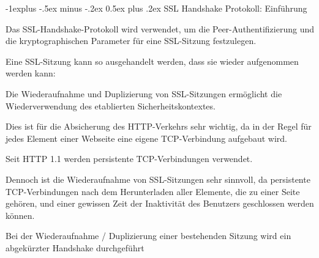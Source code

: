 \documentclass[a4paper]{article}
\makeatletter
\renewcommand{\subsection}{\@startsection{subsection}{2}{0mm}%
 {-1explus -.5ex minus -.2ex}%
 {0.5ex plus .2ex}%
 {\normalfont\normalsize\bfseries}}
\makeatother
\begin{document}
\begin{multicols}{3}
\begin{itemize*}
            \subsection{SSL Handshake Protokoll:
                  Einführung}
            \begin{itemize*}
                  \item       Das SSL-Handshake-Protokoll wird verwendet, um die
                  Peer-Authentifizierung und die kryptographischen Parameter für eine
                  SSL-Sitzung festzulegen.
                  \item       Eine SSL-Sitzung kann so ausgehandelt werden, dass sie wieder
                  aufgenommen werden kann:
                  \begin{itemize*}
                        \item Die Wiederaufnahme und Duplizierung von SSL-Sitzungen ermöglicht die Wiederverwendung des etablierten Sicherheitskontextes.
                        \item Dies ist für die Absicherung des HTTP-Verkehrs sehr wichtig, da in der Regel für jedes Element einer Webseite eine eigene TCP-Verbindung aufgebaut wird.
                        \begin{itemize*} \item Seit HTTP 1.1 werden persistente TCP-Verbindungen verwendet. \item Dennoch ist die Wiederaufnahme von SSL-Sitzungen sehr sinnvoll, da persistente TCP-Verbindungen nach dem Herunterladen aller Elemente, die zu einer Seite gehören, und einer gewissen Zeit der Inaktivität des Benutzers geschlossen werden können. \end{itemize*}
                        \item Bei der Wiederaufnahme / Duplizierung einer bestehenden Sitzung wird ein abgekürzter Handshake durchgeführt
                  \end{itemize*}
            \end{itemize*}


\end{itemize*}
\end{multicols}
\end{document}
